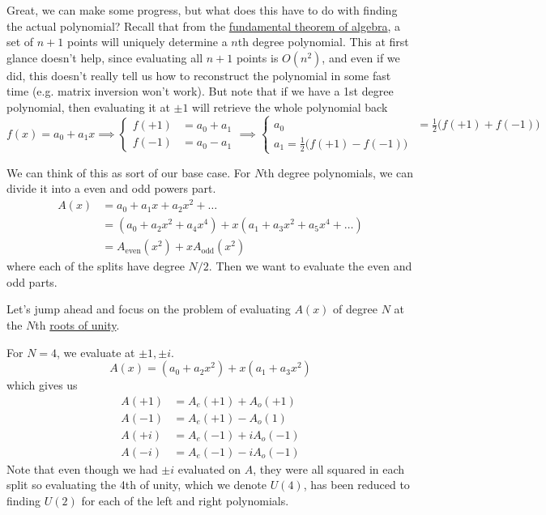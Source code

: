   Great, we can make some progress, but what does this have to do with finding the actual polynomial? Recall that from the \hyperref[cx-thm:fundamental-theorem-of-algebra]{fundamental theorem of algebra}, a set of $n+1$ points will uniquely determine a $n$th degree polynomial. This at first glance doesn't help, since evaluating all $n+1$ points is $O(n^2)$, and even if we did, this doesn't really tell us how to reconstruct the polynomial in some fast time (e.g. matrix inversion won't work). But note that if we have a 1st degree polynomial, then evaluating it at $\pm1$ will retrieve the whole polynomial back
  \begin{equation}
    f(x) = a_0 + a_1 x \implies \begin{cases} f(+1) & = a_0 + a_1 \\ f(-1) & = a_0 - a_1 \end{cases} \implies \begin{cases} a_0 & = \frac{1}{2} \big( f(+1) + f(-1) \big) \\ a_1 = \frac{1}{2} \big( f(+1) - f(-1) \big) \end{cases}
  \end{equation}

  We can think of this as sort of our base case. For $N$th degree polynomials, we can divide it into a even and odd powers part. 
  \begin{align}
    A(x) & = a_0 + a_1 x + a_2 x^2 + \ldots \\ 
         & = (a_0 + a_2 x^2 + a_4 x^4) + x (a_1 + a_3 x^2 + a_5 x^4 + \ldots ) \\
         & = A_{\mathrm{even}} (x^2) + x A_{\mathrm{odd}} (x^2) 
  \end{align}
  where each of the splits have degree $N/2$. Then we want to evaluate the even and odd parts. 

  Let's jump ahead and focus on the problem of evaluating $A(x)$ of degree $N$ at the $N$th \hyperref[cx-thm:roots-of-unity]{roots of unity}. 

  \begin{example}
    \label{ex:fft-evaluation-at-the-fourth-roots-of-unity}
    For $N = 4$, we evaluate at $\pm 1, \pm i$. 
    \begin{equation}
      A(x) = (a_0 + a_2 x^2) + x (a_1 + a_3 x^2) 
    \end{equation}
    which gives us 
    \begin{align}
      A(+1) & = A_e (+1) + A_o (+1) \\ 
      A(-1) & = A_e (+1) - A_o (1) \\ 
      A(+i) & = A_e (-1) + i A_o (-1) \\ 
      A(-i) & = A_e (-1) - i A_o (-1) 
    \end{align}
    Note that even though we had $\pm i$ evaluated on $A$, they were all squared in each split so evaluating the 4th of unity, which we denote $U(4)$, has been reduced to finding $U(2)$ for each of the left and right polynomials. 
  \end{example}

